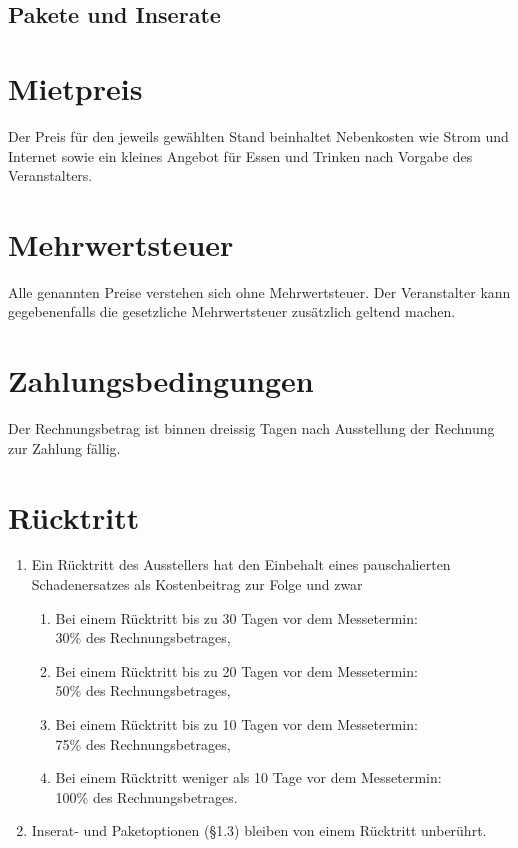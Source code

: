 \datechoice

\subsection{Pakete und Inserate}

\extrachoice

\section{Mietpreis}

Der Preis für den jeweils gewählten Stand beinhaltet Nebenkosten wie Strom und Internet sowie ein kleines Angebot für Essen und Trinken nach Vorgabe des Veranstalters. 

\section{Mehrwertsteuer}

Alle genannten Preise verstehen sich ohne Mehrwertsteuer. Der Veranstalter kann gegebenenfalls die gesetzliche Mehrwertsteuer zusätzlich geltend machen.

\section{Zahlungsbedingungen}

Der Rechnungsbetrag ist binnen dreissig Tagen nach Ausstellung der Rechnung zur Zahlung fällig.

\section{Rücktritt}
\begin{enumerate}
	\item Ein Rücktritt des Ausstellers hat den Einbehalt eines pauschalierten 			
		Schadenersatzes als Kostenbeitrag zur Folge und zwar
	\begin{enumerate}
		\item Bei einem Rücktritt bis zu 30 Tagen vor dem Messetermin:\\
			30\% des Rechnungsbetrages,
		\item Bei einem Rücktritt bis zu 20 Tagen vor dem Messetermin:\\
			50\% des Rechnungsbetrages,
		\item Bei einem Rücktritt bis zu 10 Tagen vor dem Messetermin:\\
			75\% des Rechnungsbetrages,
		\item Bei einem Rücktritt weniger als 10 Tage vor dem Messetermin:\\
			100\% des Rechnungsbetrages.
	\end{enumerate}

	\item Inserat- und Paketoptionen (\S 1.3) bleiben von einem Rücktritt unberührt.
\end{enumerate}

